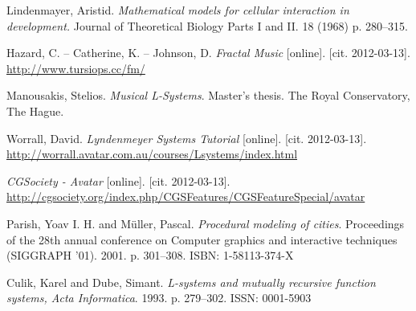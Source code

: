 


\def\bibname{References}
\begin{thebibliography}{99}
\addcontentsline{toc}{chapter}{\bibname}

	{\sc Lindenmayer,} Aristid.
	\emph{Mathematical models for cellular interaction in development.}
	Journal of Theoretical Biology Parts I and II.
	18 (1968)
	p. 280--315.
	
	{\sc Hazard,} C. -- {\sc Catherine,} K. -- {\sc Johnson,} D.
	\emph{Fractal Music} [online]. [cit. 2012-03-13].
	\url{http://www.tursiops.cc/fm/}
	
	{\sc Manousakis,} Stelios.
	\emph{Musical L-Systems}.
	Master’s thesis.
	The Royal Conservatory, The Hague.
	
	{\sc Worrall,} David.
	\emph{Lyndenmeyer Systems Tutorial} [online]. [cit. 2012-03-13].
	\url{http://worrall.avatar.com.au/courses/Lsystems/index.html}
	
	\emph{CGSociety - Avatar} [online]. [cit. 2012-03-13].
	\url{http://cgsociety.org/index.php/CGSFeatures/CGSFeatureSpecial/avatar}
		
	{\sc Parish,} Yoav I. H. and {\sc M\"{u}ller,} Pascal.
	\emph{Procedural modeling of cities}.
	Proceedings of the 28th annual conference on Computer graphics and interactive techniques (SIGGRAPH '01).
	2001.
	p. 301--308.
	ISBN: 1-58113-374-X
	
	{\sc Culik,} Karel and {\sc Dube,} Simant.
	\emph{L-systems and mutually recursive function systems, Acta Informatica}.
	1993.
	p. 279--302.
	ISSN: 0001-5903
	



\end{thebibliography}
